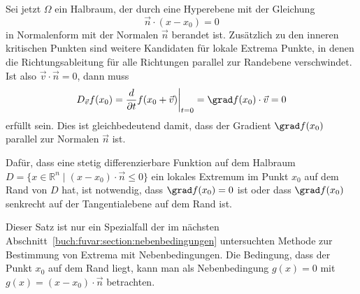 Sei jetzt $\Omega$ ein Halbraum, der durch eine Hyperebene mit der Gleichung
\[
\vec{n}\cdot (x-x_0) = 0
\]
in Normalenform mit der Normalen $\vec{n}$ berandet ist.
Zusätzlich zu den inneren kritischen Punkten sind weitere Kandidaten
für lokale Extrema Punkte, in denen die Richtungsableitung für alle
Richtungen parallel zur Randebene verschwindet.
Ist also $\vec{v}\cdot \vec{n}=0$, dann muss
\[
D_{\vec{v}} f(x_0)
=
\frac{d}{\partial t}f(x_0+\vec{v})\bigg|_{t=0}
=
\grad f(x_0)\cdot \vec{v}
=
0
\]
erfüllt sein.
Dies ist gleichbedeutend damit, dass der Gradient $\grad f(x_0)$ parallel
zur Normalen $\vec{n}$ ist.

\begin{satz}
Dafür, dass eine stetig differenzierbare Funktion auf dem Halbraum
$D=\{x\in\mathbb{R}^n\mid (x-x_0)\cdot\vec{n}\le 0\}$ ein lokales 
Extremum im Punkt $x_0$ auf dem Rand von $D$ hat, ist notwendig,
dass $\grad f(x_0)=0$ ist oder dass $\grad f(x_0)$ senkrecht auf der Tangentialebene auf dem Rand ist.
\end{satz}

Dieser Satz ist nur ein Spezialfall der im nächsten
Abschnitt~\ref{buch:fuvar:section:nebenbedingungen}
untersuchten Methode zur Bestimmung von Extrema mit Nebenbedingungen.
Die Bedingung, dass der Punkt $x_0$ auf dem Rand liegt, kann man
als Nebenbedingung $g(x) = 0$ mit $g(x)=(x-x_0)\cdot\vec{n}$ betrachten.

